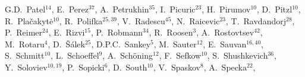 \documentclass[12pt]{article}
\begin{document}
\begin{flushleft}
G.D.~Patel$^{14}$,             %
E.~Perez$^{37}$,               %
A.~Petrukhin$^{35}$,           %
I.~Picuric$^{23}$,             %
H.~Pirumov$^{10}$,             %
D.~Pitzl$^{10}$,               %
R.~Pla\v{c}akyt\.{e}$^{10}$,   %
R.~Polifka$^{25,39}$,          %
V.~Radescu$^{45}$,             %
N.~Raicevic$^{23}$,            %
T.~Ravdandorj$^{28}$,          %
P.~Reimer$^{24}$,              %
E.~Rizvi$^{15}$,               %
P.~Robmann$^{34}$,             %
R.~Roosen$^{3}$,               %
A.~Rostovtsev$^{42}$,          %
M.~Rotaru$^{4}$,               %
D.~\v S\'alek$^{25}$,          %
D.P.C.~Sankey$^{5}$,           %
M.~Sauter$^{12}$,              %
E.~Sauvan$^{16,40}$,           %
S.~Schmitt$^{10}$,             %
L.~Schoeffel$^{9}$,            %
A.~Sch\"oning$^{12}$,          %
F.~Sefkow$^{10}$,              %
S.~Shushkevich$^{36}$,         %
Y.~Soloviev$^{10,19}$,         %
P.~Sopicki$^{6}$,              %
D.~South$^{10}$,               %
V.~Spaskov$^{8}$,              %
A.~Specka$^{22}$,              %

\end{flushleft}
\end{document}
